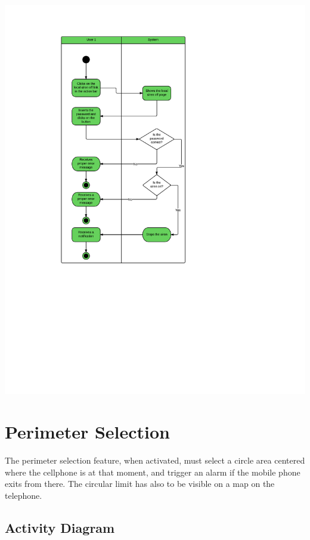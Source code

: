 \newpage
\includegraphics[scale=0.7]{images/localsirenoff}


\section{Perimeter Selection}

The perimeter selection feature, when activated, must select a circle area
centered where the cellphone is at that moment, and trigger an alarm if the
mobile phone exits from there. The circular limit has also to be visible on a
map on the telephone.


\newpage
\subsection{Activity Diagram}

